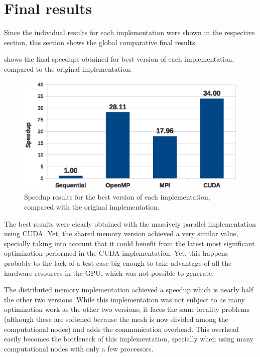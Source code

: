 \section{Final results}
\label{sec:finalresults}

Since the individual results for each implementation were shown in the respective section, this section shows the global comparative final results.

 shows the final speedups obtained for best version of each implementation, compared to the original implementation.

\begin{figure}[!htp]
	\centering
	\includegraphics[width=\columnwidth]{images/graph_comparison_all.eps}
	\caption{Speedup results for the best version of each implementation, compared with the original implementation.}
	\label{fig:results:final}
\end{figure}

The best results were clearly obtained with the massively parallel implementation using CUDA. Yet, the shared memory version achieved a very similar value, specially taking into account that it could benefit from the latest most significant optimization performed in the CUDA implementation.
Yet, this happens probably to the lack of a test case big enough to take advantage of all the hardware resources in the GPU, which was not possible to generate.

The distributed memory implementation achieved a speedup which is nearly half the other two versions.
While this implementation was not subject to as many optimization work as the other two versions, it faces the same locality problems (although these are softened because the mesh is now divided among the computational nodes) and adds the communication overhead.
This overhead easily becomes the bottleneck of this implementation, specially when using many computational nodes with only a few processors.
